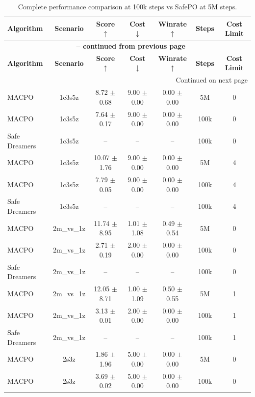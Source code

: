 \begin{longtable}{lcccccc}
\caption{Complete performance comparison at 100k steps vs SafePO at 5M steps.}
\label{tab:complete_performance_comparison_100k} \\
\toprule
\textbf{Algorithm} & \textbf{Scenario} & \textbf{Score} $\uparrow$ & \textbf{Cost} $\downarrow$ & \textbf{Winrate} $\uparrow$ & \textbf{Steps} & \textbf{Cost Limit} \\
\midrule
\endfirsthead
\multicolumn{7}{c}{{\bfseries \tablename\ \thetable{} -- continued from previous page}} \\
\toprule
\textbf{Algorithm} & \textbf{Scenario} & \textbf{Score} $\uparrow$ & \textbf{Cost} $\downarrow$ & \textbf{Winrate} $\uparrow$ & \textbf{Steps} & \textbf{Cost Limit} \\
\midrule
\endhead
\midrule \multicolumn{7}{r}{{Continued on next page}} \\
\endfoot
\bottomrule
\endlastfoot
MACPO & 1c3s5z & 8.72 $\pm$ 0.68 & 9.00 $\pm$ 0.00 & 0.00 $\pm$ 0.00 & 5M & 0 \\
MACPO & 1c3s5z & 7.64 $\pm$ 0.17 & 9.00 $\pm$ 0.00 & 0.00 $\pm$ 0.00 & 100k & 0 \\
Safe Dreamers & 1c3s5z & -- & -- & -- & 100k & 0 \\
\midrule
MACPO & 1c3s5z & 10.07 $\pm$ 1.76 & 9.00 $\pm$ 0.00 & 0.00 $\pm$ 0.00 & 5M & 4 \\
MACPO & 1c3s5z & 7.79 $\pm$ 0.05 & 9.00 $\pm$ 0.00 & 0.00 $\pm$ 0.00 & 100k & 4 \\
Safe Dreamers & 1c3s5z & -- & -- & -- & 100k & 4 \\
\midrule
MACPO & 2m\_vs\_1z & 11.74 $\pm$ 8.95 & 1.01 $\pm$ 1.08 & 0.49 $\pm$ 0.54 & 5M & 0 \\
MACPO & 2m\_vs\_1z & 2.71 $\pm$ 0.19 & 2.00 $\pm$ 0.00 & 0.00 $\pm$ 0.00 & 100k & 0 \\
Safe Dreamers & 2m\_vs\_1z & -- & -- & -- & 100k & 0 \\
\midrule
MACPO & 2m\_vs\_1z & 12.05 $\pm$ 8.71 & 1.00 $\pm$ 1.09 & 0.50 $\pm$ 0.55 & 5M & 1 \\
MACPO & 2m\_vs\_1z & 3.13 $\pm$ 0.01 & 2.00 $\pm$ 0.00 & 0.00 $\pm$ 0.00 & 100k & 1 \\
Safe Dreamers & 2m\_vs\_1z & -- & -- & -- & 100k & 1 \\
\midrule
MACPO & 2s3z & 1.86 $\pm$ 1.96 & 5.00 $\pm$ 0.00 & 0.00 $\pm$ 0.00 & 5M & 0 \\
MACPO & 2s3z & 3.69 $\pm$ 0.02 & 5.00 $\pm$ 0.00 & 0.00 $\pm$ 0.00 & 100k & 0 \\

\end{longtable}
